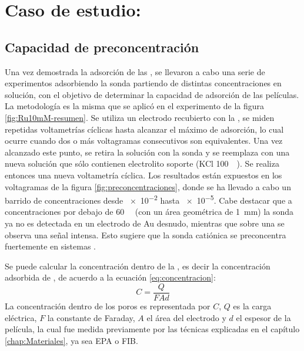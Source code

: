\section{Caso de estudio: \texorpdfstring{\aminorutenioCompleto}{Ru(NH3)CL3}}
	
	\subsection{Capacidad de preconcentración}\label{sub:capacidad_de_preconcentraci_n}

		Una vez demostrada la adsorción \ru\space de las \pdm, se llevaron a cabo una serie de experimentos adsorbiendo la sonda partiendo de distintas concentraciones en solución, con el objetivo de determinar la capacidad de adsorción de las películas. La metodología es la misma que se aplicó en el experimento de la figura \ref{fig:Ru10mM-resumen}. Se utiliza un electrodo recubierto con la \pdmF, se miden repetidas voltametrías cíclicas hasta alcanzar el máximo de adsorción, lo cual ocurre cuando dos o más voltagramas consecutivos son equivalentes. Una vez alcanzado este punto, se retira la solución con la sonda y se reemplaza con una nueva solución que sólo contienen electrolito soporte (KCl \SI{100}{\milli\Molar}). Se realiza entonces una nueva voltametría cíclica. Los resultados están expuestos en los voltagramas de la figura \ref{fig:preconcentraciones}, donde se ha llevado a cabo un barrido de concentraciones desde \SI{e-2}{\Molar} hasta \SI{e-5}{\Molar}. Cabe destacar que a concentraciones por debajo de \SI{60}{\micro\Molar} (con un área geométrica de \SI{1}{mm}) la sonda ya no es detectada en un electrodo de Au  desnudo, mientras que sobre una \pdm\space se observa una señal intensa. Esto sugiere que la sonda catiónica se preconcentra fuertemente en sistemas \pdmF.


		Se puede calcular la concentración dentro de la \pdm, es decir la concentración adsorbida de \ru, de acuerdo a la ecuación \ref{eq:concentracion}:
				\begin{equation}
					C=\frac{Q}{FAd}
					\label{eq:concentracion}
					\end{equation}
		La concentración dentro de los poros es representada por $C$, $Q$ es la carga eléctrica, $F$ la constante de Faraday, $A$ el área del electrodo y $d$ el espesor de la película, la cual fue medida previamente por las técnicas explicadas en el capítulo \ref{chap:Materiales}, ya sea EPA o FIB.

